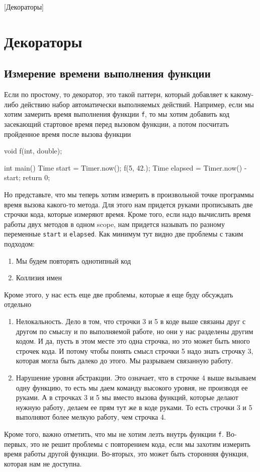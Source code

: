 [Декораторы]

\section{Декораторы}
\label{section::Decorators}

\subsection{Измерение времени выполнения функции}
\label{section::TimeEstimation}

Если по простому, то декоратор, это такой паттерн, который добавляет к какому-либо действию набор автоматически выполняемых действий.
Например, если мы хотим замерить время выполнения функции \verb"f", то мы хотим добавить код засекающий стартовое время перед вызовом функции, а потом посчитать пройденное время после вызова функции
\begin{cppcode}
void f(int, double);

int main() {
  Time start = Timer.now();
  f(5, 42.);
  Time elapsed = Timer.now() - start;
  return 0;
}
\end{cppcode}
Но представьте, что мы теперь хотим измерить в произвольной точке программы время вызова какого-то метода.
Для этого нам придется руками прописывать две строчки кода, которые измеряют время.
Кроме того, если надо вычислить время работы двух методов в одном scope, нам придется называть по разному переменные \verb"start" и \verb"elapsed".
Как минимум тут видно две проблемы с таким подходом:
\begin{enumerate}
\item Мы будем повторять однотипный код

\item Коллизия имен
\end{enumerate}
Кроме этого, у нас есть еще две проблемы, которые я еще буду обсуждать отдельно
\begin{enumerate}
\item Нелокальность.
Дело в том, что строчки 3 и 5 в коде выше связаны друг с другом по смыслу и по выполняемой работе, но они у нас разделены другим кодом.
И да, пусть в этом месте это одна строчка, но это может быть много строчек кода.
И потому чтобы понять смысл строчки 5 надо знать строчку 3, которая могла быть далеко до этого.
Мы разрываем связанную работу.

\item Нарушение уровня абстракции.
Это означает, что в строчке 4 выше вызываем одну функцию, то есть мы даем команду высокого уровня, не производя ее руками.
А в строчках 3 и 5 мы вместо вызова функций, которые делают нужную работу, делаем ее прям тут же в коде руками.
То есть строчки 3 и 5 выполняют более мелкую работу, чем строчка 4.
\end{enumerate}
Кроме того, важно отметить, что мы не хотим лезть внутрь функции \verb"f".
Во-первых, это не решит проблемы с повторением кода, если мы захотим измерить время работы другой функции.
Во-вторых, это может быть сторонняя функция, которая нам не доступна.

